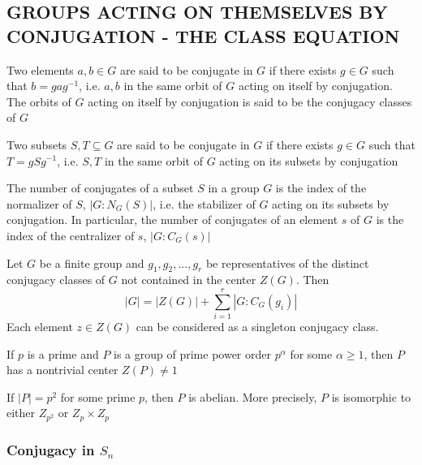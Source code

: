\subsection{GROUPS ACTING ON THEMSELVES BY CONJUGATION - THE CLASS EQUATION}

\begin{definition}
	Two elements $a, b \in G$ are said to be conjugate in $G$ if there exists $g \in G$ such that $b = gag^{-1}$, i.e. $a, b$ in the same orbit of $G$ acting on itself by conjugation. The orbits of $G$ acting on itself by conjugation is said to be the conjugacy classes of $G$
\end{definition}

\begin{definition}[Conjugate]
	Two subsets $S, T \subseteq G$ are said to be conjugate in $G$ if there exists $g \in G$ such that $T = gSg^{-1}$, i.e. $S, T$ in the same orbit of $G$ acting on its subsets by conjugation
\end{definition}

\begin{proposition}
	The number of conjugates of a subset $S$ in a group $G$ is the index of the normalizer of $S$, $|G : N_G(S)|$, i.e. the stabilizer of $G$ acting on its subsets by conjugation. In particular, the number of conjugates of an element $s$ of $G$ is the index of the centralizer of $s$, $|G : C_G(s)|$
\end{proposition}

\begin{theorem}
	Let $G$ be a finite group and $g_1, g_2, ..., g_r$ be representatives of the distinct conjugacy classes of $G$ not contained in the center $Z(G)$. Then
	\[
	|G| = |Z(G)| + \sum_{i=1}^r |G : C_G(g_i)|
	\]
	Each element $z \in Z(G)$ can be considered as a singleton conjugacy class.
\end{theorem}

\begin{theorem}
	If $p$ is a prime and $P$ is a group of prime power order $p^\alpha$ for some $\alpha \geq 1$, then $P$ has a nontrivial center $Z(P) \neq 1$
\end{theorem}

\begin{corollary}
	If $|P| = p^2$ for some prime $p$, then $P$ is abelian. More precisely, $P$ is isomorphic to either $Z_{p^2}$ or $Z_p \times Z_p$
\end{corollary}

\subsubsection{Conjugacy in $S_n$}

